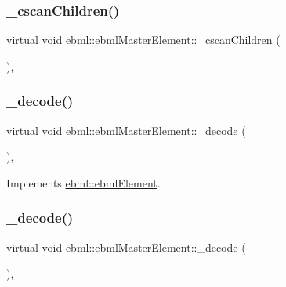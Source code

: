 \subsubsection{\texorpdfstring{\+\_\+cscan\+Children()}{\_cscanChildren()}}
{\footnotesize\ttfamily virtual void ebml\+::ebml\+Master\+Element\+::\+\_\+cscan\+Children (\begin{DoxyParamCaption}\item[{\mbox{\hyperlink{classebml_1_1parseFile_1_1iterator}{parse\+File\+::iterator}} \&}]{ }\end{DoxyParamCaption})\hspace{0.3cm}{\ttfamily [protected]}, {\ttfamily [virtual]}}

\mbox{\label{classebml_1_1ebmlMasterElement_af181a3280da5c875497324955f75e62c}} 
\subsubsection{\texorpdfstring{\+\_\+decode()}{\_decode()}\hspace{0.1cm}{\footnotesize\ttfamily [1/2]}}
{\footnotesize\ttfamily virtual void ebml\+::ebml\+Master\+Element\+::\+\_\+decode (\begin{DoxyParamCaption}\item[{const \mbox{\hyperlink{classebml_1_1parseString}{parse\+String}} \&}]{ }\end{DoxyParamCaption})\hspace{0.3cm}{\ttfamily [protected]}, {\ttfamily [virtual]}}



Implements \mbox{\hyperlink{classebml_1_1ebmlElement_af7852c01970bf937f6787eac4843bdbd}{ebml\+::ebml\+Element}}.

\mbox{\label{classebml_1_1ebmlMasterElement_a0c96ec791e04e776c8f7ae969e164855}} 
\subsubsection{\texorpdfstring{\+\_\+decode()}{\_decode()}\hspace{0.1cm}{\footnotesize\ttfamily [2/2]}}
{\footnotesize\ttfamily virtual void ebml\+::ebml\+Master\+Element\+::\+\_\+decode (\begin{DoxyParamCaption}\item[{const \mbox{\hyperlink{classebml_1_1parseFile}{parse\+File}} \&}]{ }\end{DoxyParamCaption})\hspace{0.3cm}{\ttfamily [protected]}, {\ttfamily [virtual]}}



